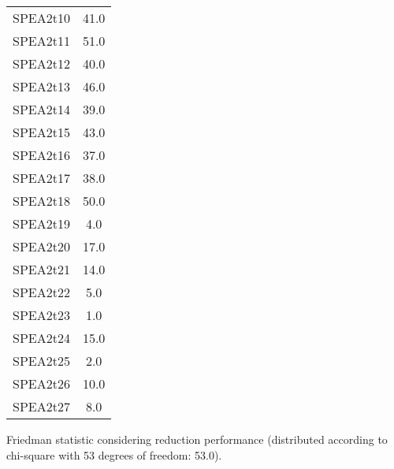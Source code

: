 \documentclass{article}
\begin{document}
\begin{table}[!htp]
\begin{tabular}{c|c}
SPEA2t10&41.0\\
SPEA2t11&51.0\\
SPEA2t12&40.0\\
SPEA2t13&46.0\\
SPEA2t14&39.0\\
SPEA2t15&43.0\\
SPEA2t16&37.0\\
SPEA2t17&38.0\\
SPEA2t18&50.0\\
SPEA2t19&4.0\\
SPEA2t20&17.0\\
SPEA2t21&14.0\\
SPEA2t22&5.0\\
SPEA2t23&1.0\\
SPEA2t24&15.0\\
SPEA2t25&2.0\\
SPEA2t26&10.0\\
SPEA2t27&8.0\\
\end{tabular}
\end{table}


Friedman statistic considering reduction performance (distributed according to chi-square with 53 degrees of freedom: 53.0).
\end{document}
